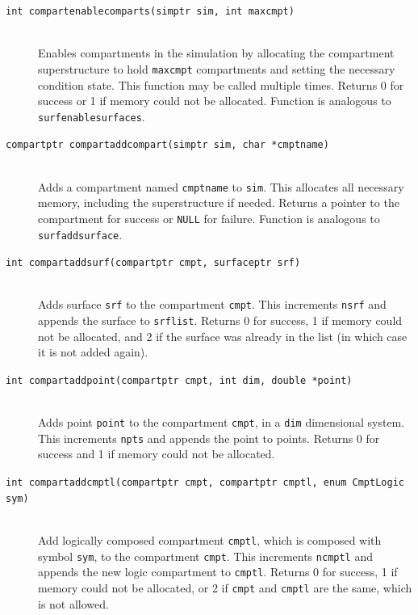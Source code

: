 \documentclass {scrbook}
\newcommand {\ttt} {\texttt}
\begin{document}
\begin{description}
\item[\ttt{int compartenablecomparts(simptr sim, int maxcmpt)}]
\hfill \\
Enables compartments in the simulation by allocating the compartment superstructure to hold \ttt{maxcmpt} compartments and setting the necessary condition state. This function may be called multiple times. Returns 0 for success or 1 if memory could not be allocated. Function is analogous to \ttt{surfenablesurfaces}.

\item[\ttt{compartptr compartaddcompart(simptr sim, char *cmptname)}]
\hfill \\
Adds a compartment named \ttt{cmptname} to \ttt{sim}. This allocates all necessary memory, including the superstructure if needed. Returns a pointer to the compartment for success or \ttt{NULL} for failure. Function is analogous to \ttt{surfaddsurface}.

\item[\ttt{int compartaddsurf(compartptr cmpt, surfaceptr srf)}]
\hfill \\
Adds surface \ttt{srf} to the compartment \ttt{cmpt}. This increments \ttt{nsrf} and appends the surface to \ttt{srflist}. Returns 0 for success, 1 if memory could not be allocated, and 2 if the surface was already in the list (in which case it is not added again).

\item[\ttt{int compartaddpoint(compartptr cmpt, int dim, double *point)}]
\hfill \\
Adds point \ttt{point} to the compartment \ttt{cmpt}, in a \ttt{dim} dimensional system. This increments \ttt{npts} and appends the point to points. Returns 0 for success and 1 if memory could not be allocated.

\item[\ttt{int compartaddcmptl(compartptr cmpt, compartptr cmptl, enum CmptLogic sym)}]
\hfill \\
Add logically composed compartment \ttt{cmptl}, which is composed with symbol \ttt{sym}, to the compartment \ttt{cmpt}. This increments \ttt{ncmptl} and appends the new logic compartment to \ttt{cmptl}. Returns 0 for success, 1 if memory could not be allocated, or 2 if \ttt{cmpt} and \ttt{cmptl} are the same, which is not allowed.


\end{description}
\end{document}
